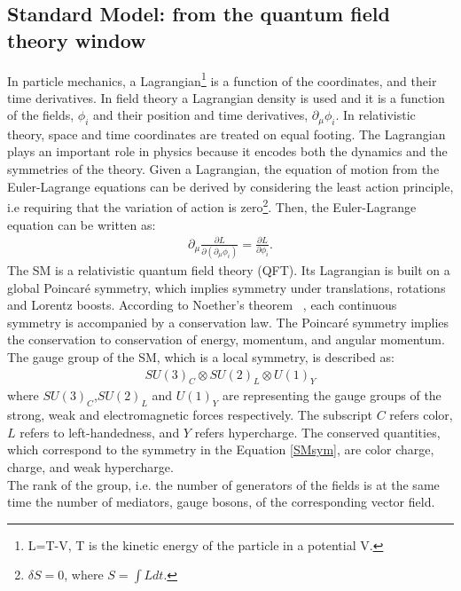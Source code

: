 \subsection{Standard Model: from the quantum field theory window }
\label{sec:StandardModelQFT}
In particle mechanics, a Lagrangian\footnote{L=T-V, T is the kinetic energy of the particle in a potential V.} is a function of the coordinates, and their time derivatives. In field theory a Lagrangian density is used and it is a function of the fields, $\phi_i$ and their position and time derivatives, $\partial_{\mu}\phi_i $. In relativistic theory, space and time coordinates are treated on equal footing. The Lagrangian plays an important role in physics because it encodes both the dynamics and the symmetries of the theory. Given a Lagrangian, the equation of motion from the Euler-Lagrange equations can be derived by considering the least action principle, i.e requiring that the variation of action is zero\footnote{$\delta S=0$, where $S=\int L dt$.}. Then, the Euler-Lagrange equation can be written as:
\begin{eqnarray}
\label{EuLag}
	{ \partial_{\mu}\frac{\partial L}{\partial(\partial_{\mu}\phi_i)}} = {\frac{\partial L}{\partial\phi_i}} .
\end{eqnarray}
The SM is a relativistic quantum field theory (QFT).  Its Lagrangian is built on a global Poincar\'{e} symmetry, which implies symmetry under translations, rotations and Lorentz boosts. According to Noether\textquoteright s theorem ~\cite{Noether}, each continuous symmetry is accompanied by a conservation law. The Poincar\'{e}‬ symmetry implies the conservation to conservation of energy, momentum, and angular momentum. The gauge group of the SM, which is a local symmetry, is described as:  
\begin{eqnarray}
\label{SMsym}
	{SU(3)_C \otimes SU(2)_L \otimes U(1)_Y}
\end{eqnarray}
where $SU(3)_C$,$SU(2)_L$ and $U(1)_Y$ are representing the gauge groups of the strong, weak and electromagnetic forces respectively. The subscript $C$ refers color, $L$ refers to left-handedness, and $Y$ refers hypercharge. 
The conserved quantities, which correspond to the symmetry in the Equation \ref{SMsym}, are color charge, charge, and weak hypercharge.\\
The rank of the group, i.e. the number of generators of the fields is at the same time the number of mediators, gauge bosons, of the corresponding vector field.
